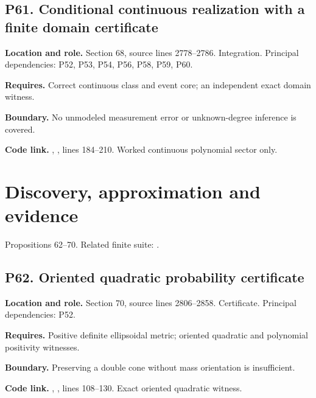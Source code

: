 \documentclass[11pt,letterpaper]{article}
\begin{document}
\par\noindent\begin{minipage}{\textwidth}
\subsection{P61. Conditional continuous realization with a finite domain
certificate}\label{p61.-conditional-continuous-realization-with-a-finite-domain-certificate}

\textbf{Location and role.} Section 68, source lines 2778--2786.
Integration. Principal dependencies: P52, P53, P54, P56, P58, P59, P60.

\textbf{Requires.} Correct continuous class and event core; an
independent exact domain witness.

\textbf{Boundary.} No unmodeled measurement error or unknown-degree
inference is covered.

\textbf{Code link.} ,
, lines 184--210. Worked continuous
polynomial sector only.
\end{minipage}\par\medskip

\newpage

\section{Discovery, approximation and
evidence}\label{discovery-approximation-and-evidence}

Propositions 62--70. Related finite suite:
.

\par\noindent\begin{minipage}{\textwidth}
\subsection{P62. Oriented quadratic probability
certificate}\label{p62.-oriented-quadratic-probability-certificate}

\textbf{Location and role.} Section 70, source lines 2806--2858.
Certificate. Principal dependencies: P52.

\textbf{Requires.} Positive definite ellipsoidal metric; oriented
quadratic and polynomial positivity witnesses.

\textbf{Boundary.} Preserving a double cone without mass orientation is
insufficient.

\textbf{Code link.} ,
, lines 108--130. Exact oriented quadratic
witness.
\end{minipage}\par\medskip
\end{document}
